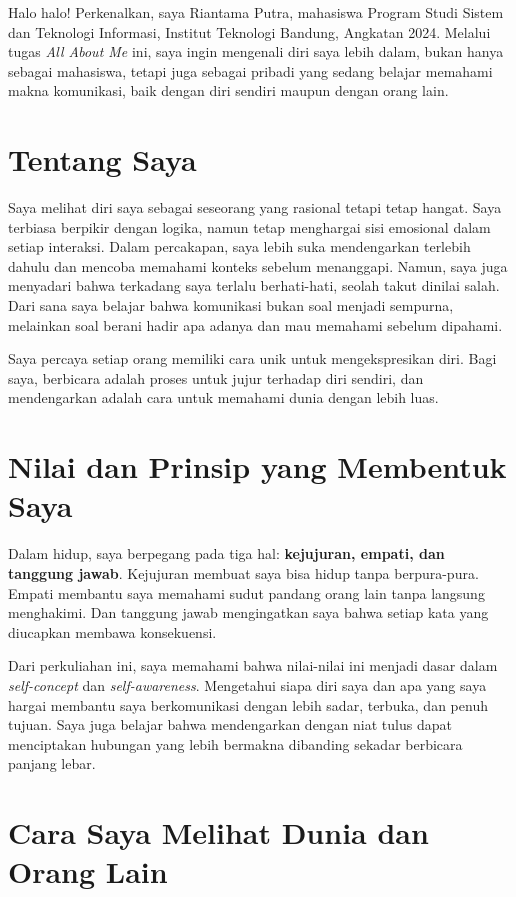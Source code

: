 \documentclass[
  letterpaper,
  DIV=11,
  numbers=noendperiod]{scrreprt}
\begin{document}
Halo halo! Perkenalkan, saya Riantama Putra, mahasiswa Program Studi
Sistem dan Teknologi Informasi, Institut Teknologi Bandung, Angkatan
2024. Melalui tugas \emph{All About Me} ini, saya ingin mengenali diri
saya lebih dalam, bukan hanya sebagai mahasiswa, tetapi juga sebagai
pribadi yang sedang belajar memahami makna komunikasi, baik dengan diri
sendiri maupun dengan orang lain.

\section{Tentang Saya}\label{tentang-saya}

Saya melihat diri saya sebagai seseorang yang rasional tetapi tetap
hangat. Saya terbiasa berpikir dengan logika, namun tetap menghargai
sisi emosional dalam setiap interaksi. Dalam percakapan, saya lebih suka
mendengarkan terlebih dahulu dan mencoba memahami konteks sebelum
menanggapi. Namun, saya juga menyadari bahwa terkadang saya terlalu
berhati-hati, seolah takut dinilai salah. Dari sana saya belajar bahwa
komunikasi bukan soal menjadi sempurna, melainkan soal berani hadir apa
adanya dan mau memahami sebelum dipahami.

Saya percaya setiap orang memiliki cara unik untuk mengekspresikan diri.
Bagi saya, berbicara adalah proses untuk jujur terhadap diri sendiri,
dan mendengarkan adalah cara untuk memahami dunia dengan lebih luas.

\section{Nilai dan Prinsip yang Membentuk
Saya}\label{nilai-dan-prinsip-yang-membentuk-saya}

Dalam hidup, saya berpegang pada tiga hal: \textbf{kejujuran, empati,
dan tanggung jawab}. Kejujuran membuat saya bisa hidup tanpa
berpura-pura. Empati membantu saya memahami sudut pandang orang lain
tanpa langsung menghakimi. Dan tanggung jawab mengingatkan saya bahwa
setiap kata yang diucapkan membawa konsekuensi.

Dari perkuliahan ini, saya memahami bahwa nilai-nilai ini menjadi dasar
dalam \emph{self-concept} dan \emph{self-awareness}. Mengetahui siapa
diri saya dan apa yang saya hargai membantu saya berkomunikasi dengan
lebih sadar, terbuka, dan penuh tujuan. Saya juga belajar bahwa
mendengarkan dengan niat tulus dapat menciptakan hubungan yang lebih
bermakna dibanding sekadar berbicara panjang lebar.

\section{Cara Saya Melihat Dunia dan Orang
Lain}\label{cara-saya-melihat-dunia-dan-orang-lain}
\end{document}
